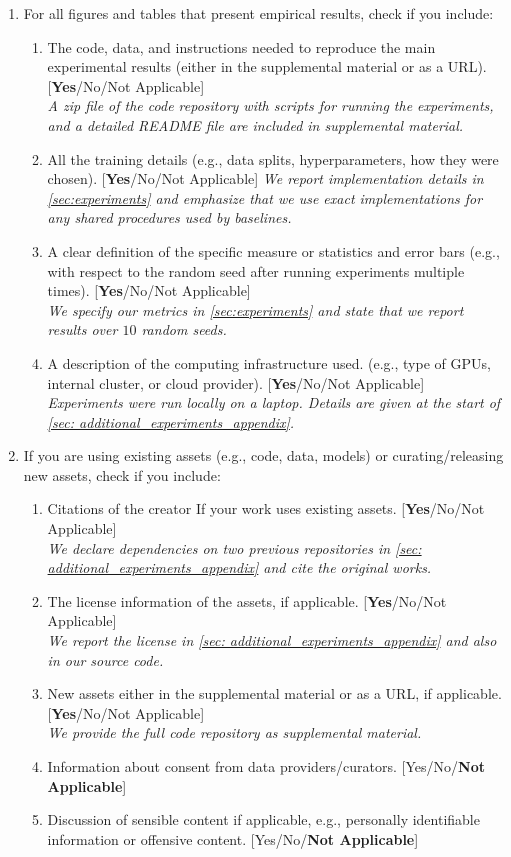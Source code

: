 \documentclass[twoside]{article}
\begin{document}
\begin{enumerate}
  \item For all figures and tables that present empirical results, check if you include:
  \begin{enumerate}
    \item The code, data, and instructions needed to reproduce the main experimental results (either in the supplemental material or as a URL). [\textbf{Yes}/No/Not Applicable]\\
    \textit{A zip file of the code repository with scripts for running the experiments, and a detailed README file are included in supplemental material.}
    \item All the training details (e.g., data splits, hyperparameters, how they were chosen). [\textbf{Yes}/No/Not Applicable]
    \textit{We report implementation details in \cref{sec:experiments} and emphasize that we use exact implementations for any shared procedures used by baselines.}
    \item A clear definition of the specific measure or statistics and error bars (e.g., with respect to the random seed after running experiments multiple times). [\textbf{Yes}/No/Not Applicable]\\
    \textit{We specify our metrics in \cref{sec:experiments} and state that  we report results over $10$ random seeds. }
    \item A description of the computing infrastructure used. (e.g., type of GPUs, internal cluster, or cloud provider). [\textbf{Yes}/No/Not Applicable]\\
    \textit{Experiments were run locally on a laptop. Details are given at the start of \cref{sec: additional_experiments_appendix}. }
  \end{enumerate}

  \item If you are using existing assets (e.g., code, data, models) or curating/releasing new assets, check if you include:
  \begin{enumerate}
    \item Citations of the creator If your work uses existing assets. [\textbf{Yes}/No/Not Applicable]\\
    \textit{We declare dependencies on two previous repositories in \cref{sec: additional_experiments_appendix} and cite the original works.}
    \item The license information of the assets, if applicable. [\textbf{Yes}/No/Not Applicable]\\
    \textit{We report the license in \cref{sec: additional_experiments_appendix} and also in our source code.}
    \item New assets either in the supplemental material or as a URL, if applicable. [\textbf{Yes}/No/Not Applicable]\\
    \textit{We provide the full code repository as supplemental material.}
    \item Information about consent from data providers/curators. [Yes/No/\textbf{Not Applicable}]
    \item Discussion of sensible content if applicable, e.g., personally identifiable information or offensive content. [Yes/No/\textbf{Not Applicable}]
  \end{enumerate}


\end{enumerate}
\end{document}
